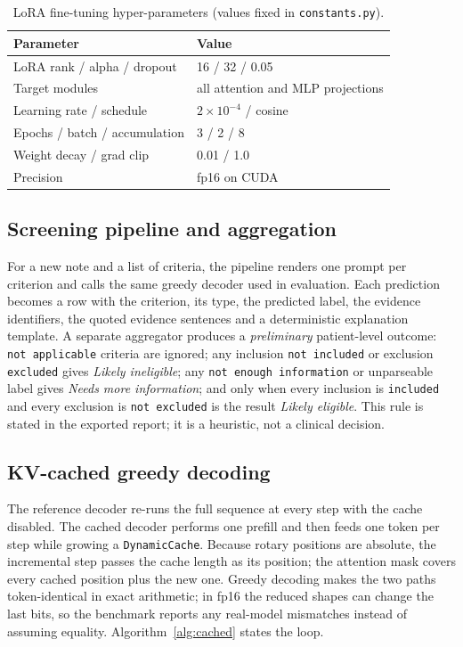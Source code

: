 \documentclass[conference]{IEEEtran}
\begin{document}
\begin{table}[t]
\centering
\caption{LoRA fine-tuning hyper-parameters (values fixed in \texttt{constants.py}).}
\label{tab:hparams}
\begin{tabular}{ll}
\toprule
Parameter & Value \\
\midrule
LoRA rank / alpha / dropout & 16 / 32 / 0.05 \\
Target modules & all attention and MLP projections \\
Learning rate / schedule & $2\times10^{-4}$ / cosine \\
Epochs / batch / accumulation & 3 / 2 / 8 \\
Weight decay / grad clip & 0.01 / 1.0 \\
Precision & fp16 on CUDA \\
\bottomrule
\end{tabular}
\end{table}

\subsection{Screening pipeline and aggregation}
For a new note and a list of criteria, the pipeline renders one prompt per criterion and calls the
same greedy decoder used in evaluation. Each prediction becomes a row with the criterion, its type,
the predicted label, the evidence identifiers, the quoted evidence sentences and a deterministic
explanation template. A separate aggregator produces a \emph{preliminary} patient-level outcome:
\texttt{not applicable} criteria are ignored; any inclusion \texttt{not included} or exclusion
\texttt{excluded} gives \emph{Likely ineligible}; any \texttt{not enough information} or
unparseable label gives \emph{Needs more information}; and only when every inclusion is
\texttt{included} and every exclusion is \texttt{not excluded} is the result \emph{Likely eligible}.
This rule is stated in the exported report; it is a heuristic, not a clinical decision.

\subsection{KV-cached greedy decoding}
The reference decoder re-runs the full sequence at every step with the cache disabled. The cached
decoder performs one prefill and then feeds one token per step while growing a
\texttt{DynamicCache}. Because rotary positions are absolute, the incremental step passes the cache
length as its position; the attention mask covers every cached position plus the new one. Greedy
decoding makes the two paths token-identical in exact arithmetic; in fp16 the reduced shapes can
change the last bits, so the benchmark reports any real-model mismatches instead of assuming
equality. Algorithm~\ref{alg:cached} states the loop.
\end{document}
